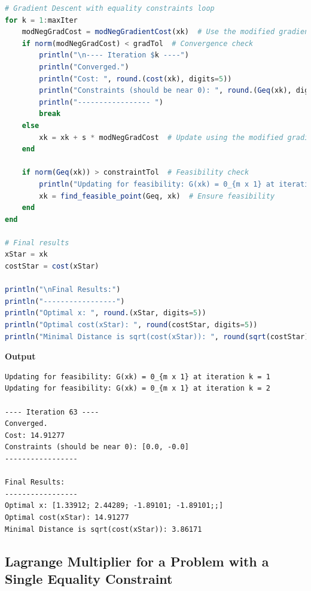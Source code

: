 \begin{lstlisting}[language=Julia,style=mystyle]
# Gradient Descent with equality constraints loop
for k = 1:maxIter
    modNegGradCost = modNegGradientCost(xk)  # Use the modified gradient cost function
    if norm(modNegGradCost) < gradTol  # Convergence check
        println("\n---- Iteration $k ----")
        println("Converged.")
        println("Cost: ", round.(cost(xk), digits=5))
        println("Constraints (should be near 0): ", round.(Geq(xk), digits=6))
        println("----------------- ")
        break
    else
        xk = xk + s * modNegGradCost  # Update using the modified gradient
    end
    
    if norm(Geq(xk)) > constraintTol  # Feasibility check
        println("Updating for feasibility: G(xk) = 0_{m x 1} at iteration k = $k")
        xk = find_feasible_point(Geq, xk)  # Ensure feasibility
    end
end

# Final results
xStar = xk
costStar = cost(xStar)

println("\nFinal Results:")
println("-----------------")
println("Optimal x: ", round.(xStar, digits=5))
println("Optimal cost(xStar): ", round(costStar, digits=5))
println("Minimal Distance is sqrt(cost(xStar)): ", round(sqrt(costStar), digits=5))

\end{lstlisting}
\textbf{Output} 
\begin{verbatim}
Updating for feasibility: G(xk) = 0_{m x 1} at iteration k = 1
Updating for feasibility: G(xk) = 0_{m x 1} at iteration k = 2

---- Iteration 63 ----
Converged.
Cost: 14.91277
Constraints (should be near 0): [0.0, -0.0]
----------------- 

Final Results:
-----------------
Optimal x: [1.33912; 2.44289; -1.89101; -1.89101;;]
Optimal cost(xStar): 14.91277
Minimal Distance is sqrt(cost(xStar)): 3.86171
\end{verbatim}






\subsection{Lagrange Multiplier for a Problem with a Single Equality Constraint}

